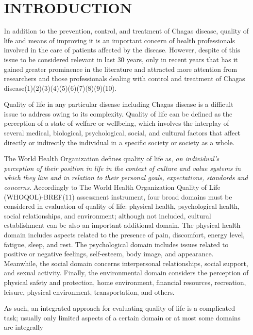 \section*{INTRODUCTION}\par In addition to the prevention, control, and treatment of Chagas disease, quality of life
 and means of improving it is an important concern of health professionals involved in
 the care of patients affected by the disease. However, despite of this issue to be
 considered relevant in last 30 years, only in recent years that has it gained greater
 prominence in the literature and attracted more attention from researchers and those
 professionals dealing with control and treatment of Chagas disease(1)(2)(3)(4)(5)(6)(7)(8)(9)(10). \par Quality of life in any particular disease including Chagas disease is a difficult issue
 to address owing to its complexity. Quality of life can be defined as the perception of
 a state of welfare or wellbeing, which involves the interplay of several medical,
 biological, psychological, social, and cultural factors that affect directly or
 indirectly the individual in a specific society or society as a whole. \par The World Health Organization defines quality of life as, \textit{an individual's
 perception of their position in life in the context of culture and value systems in
 which they live and in relation to their personal goals, expectations, standards and
 concerns}. Accordingly to The World Health Organization Quality of Life
 (WHOQOL)-BREF(11) assessment instrument, four
 broad domains must be considered in evaluation of quality of life: physical health,
 psychological health, social relationships, and environment; although not included,
 cultural establishment can be also an important additional domain. The physical health
 domain includes aspects related to the presence of pain, discomfort, energy level,
 fatigue, sleep, and rest. The psychological domain includes issues related to positive
 or negative feelings, self-esteem, body image, and appearance. Meanwhile, the social
 domain concerns interpersonal relationships, social support, and sexual activity.
 Finally, the environmental domain considers the perception of physical safety and
 protection, home environment, financial resources, recreation, leisure, physical
 environment, transportation, and others.\par As such, an integrated approach for evaluating quality of life is a complicated task;
 usually only limited aspects of a certain domain or at most some domains are integrally
